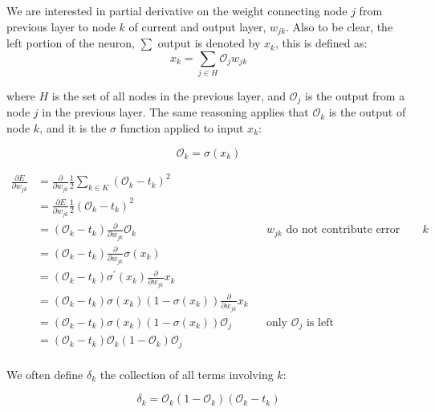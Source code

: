 \documentclass[11pt]{article}
\begin{document}
We are interested in partial derivative on the weight connecting node $j$ from previous layer to node $k$ of current and output layer, $w_{jk}$. Also to be clear, the left portion of the neuron, $\sum$ output is denoted by $x_k$, this is defined as:
\begin{equation}
\label{eq:xk}
x_k = \sum_{j \in H} \mathcal{O}_j w_{jk}
\end{equation}

where $H$ is the set of all nodes in the previous layer, and $\mathcal{O}_j$ is the output from a node $j$ in the previous layer. The same reasoning applies that $\mathcal{O}_k$ is the output of node $k$, and it is the $\sigma$ function applied to input $x_k$:

\begin{equation}
\mathcal{O}_k = \sigma(x_k)
\end{equation}




\begin{align*}
\frac{\partial E}{\partial w_{jk}}  &= \frac{\partial}{\partial w_{jk}}
            \frac{1}{2} \sum_{k\in K}(\mathcal{O}_k - t_k)^2 \\
        &= \frac{\partial E}{\partial w_{jk}} \frac{1}{2} (\mathcal{O}_k - t_k)^2 \\
        &= (\mathcal{O}_k - t_k) \frac{\partial}{\partial w_{jk}} \mathcal{O}_k && \text{$w_{jk}$ do not contribute error other than node $k$} \\
        &= (\mathcal{O}_k - t_k) \frac{\partial}{\partial w_{jk}} \sigma(x_k) \\
        &= (\mathcal{O}_k - t_k) \sigma^{\prime}(x_k) \frac{\partial}{\partial w_{jk}} x_k \\
        &= (\mathcal{O}_k - t_k) \sigma(x_k) (1-\sigma(x_k)) \frac{\partial}{\partial w_{jk}} x_k \\
        &= (\mathcal{O}_k - t_k) \sigma(x_k) (1-\sigma(x_k)) \mathcal{O}_j && \text{only $\mathcal{O}_j$ is left}\\
        &= (\mathcal{O}_k - t_k) \mathcal{O}_k (1-\mathcal{O}_k) \mathcal{O}_j \\
\end{align*}


We often define $\delta_k$ the collection of all terms involving $k$:

\begin{equation}
\delta_k = \mathcal{O}_k (1-\mathcal{O}_k) (\mathcal{O}_k - t_k)
\end{equation}
\end{document}
